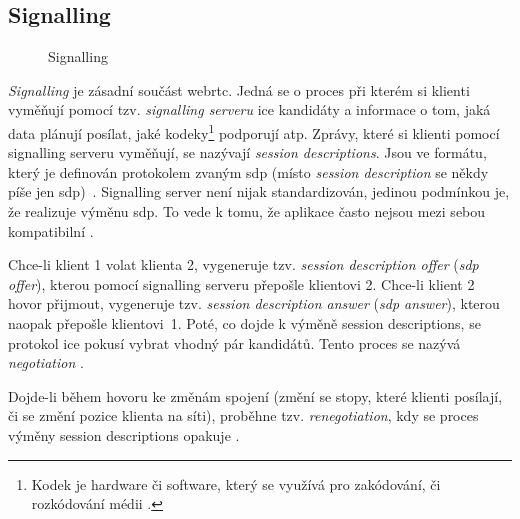 \subsection{Signalling}\label{signalling}

\begin{figure}[H]
    \centering
    \caption{Signalling}
    \label{signallingServer}
\end{figure}

\textit{Signalling} je zásadní součást \gls{webrtc}. Jedná se o proces při
kterém si klienti vyměňují pomocí tzv. \textit{signalling serveru} \gls{ice}
kandidáty a informace o tom, jaká data plánují posílat, jaké
kodeky\footnote{Kodek je hardware či software, který se využívá pro zakódování,
    či rozkódování médii \parencite{Britannica-Codec,TechTarget-Codec}.} podporují
atp. Zprávy, které si klienti pomocí signalling serveru vyměňují, se nazývají
\textit{session descriptions}. Jsou ve formátu, který je definován protokolem
zvaným \gls{sdp} (místo \textit{session description} se někdy píše jen
\gls{sdp})~\parencite{WebRTCForTheCurious}. Signalling server není nijak
standardizován, jedinou podmínkou je, že realizuje výměnu \gls{sdp}. To vede k
tomu, že aplikace často nejsou mezi sebou kompatibilní
\parencite{MDN-Web-SignalingAndVideoCalling}.

Chce-li klient 1 volat klienta 2, vygeneruje tzv. \textit{session description
    offer} (\textit{\gls{sdp} offer}), kterou pomocí signalling serveru přepošle
klientovi 2. Chce-li klient 2 hovor přijmout, vygeneruje tzv.
\textit{session description answer} (\textit{\gls{sdp} answer}), kterou
naopak přepošle klientovi~1. Poté, co dojde k výměně session descriptions,
se protokol \gls{ice} pokusí vybrat vhodný pár kandidátů. Tento proces se
nazývá \textit{negotiation}
\parencite{WebRTCForTheCurious,MozillaBlog-PerfectNegotiation}.

Dojde-li během hovoru ke změnám spojení (změní se stopy, které klienti posílají,
či se změní pozice klienta na síti), proběhne tzv. \textit{renegotiation}, kdy
se proces výměny session descriptions opakuje
\parencite{MozillaBlog-PerfectNegotiation}.

